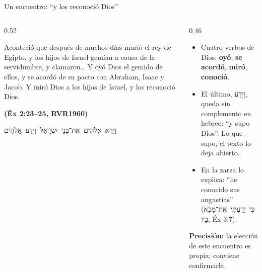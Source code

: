 \documentclass[hyperref={bookmarks=false},aspectratio=169]{beamer}
\newcommand{\heb}[1]{\mbox{\foreignlanguage{hebrew}{#1}}}
\newcommand{\fuente}[1]{\par\hfill{\upshape\bfseries\footnotesize\textcolor{azul}{#1}}}
\newcommand{\destacar}[1]{\textbf{\textcolor{azul}{#1}}}
\newcommand{\precision}[1]{{\footnotesize\color{gris}\textbf{Precisión:} #1}}
\begin{document}
\begin{frame}{Un encuentro: ``y los reconoció Dios''}
\begin{columns}[t,onlytextwidth]
\begin{column}{0.52\textwidth}
\begin{cita}Aconteció que después de muchos días murió el rey de Egipto, y los hijos de Israel gemían a causa de la servidumbre, y clamaron\ldots{} Y oyó Dios el gemido de ellos, y se acordó de su pacto con Abraham, Isaac y Jacob. Y miró Dios a los hijos de Israel, y los reconoció Dios.\fuente{(Éx 2:23--25, RVR1960)}\end{cita}
\begin{center}\heb{וַיַּרְא אֱלֹהִים אֶת־בְּנֵי יִשְׂרָאֵל וַיֵּדַע אֱלֹהִים}\end{center}
\end{column}
\begin{column}{0.46\textwidth}\small
\begin{itemize}
\item Cuatro verbos de Dios: \destacar{oyó}, \destacar{se acordó}, \destacar{miró}, \destacar{conoció}.
\item El último, \heb{וַיֵּדַע}, queda sin complemento en hebreo: ``y supo Dios''. Lo que supo, el texto lo deja abierto.
\item En la zarza lo explica: ``he conocido sus angustias'' (\heb{כִּי יָדַעְתִּי אֶת־מַכְאֹבָיו}, Éx 3:7).
\end{itemize}
\precision{la elección de este encuentro es propia; conviene confirmarla.}
\end{column}
\end{columns}
\end{frame}
\end{document}
